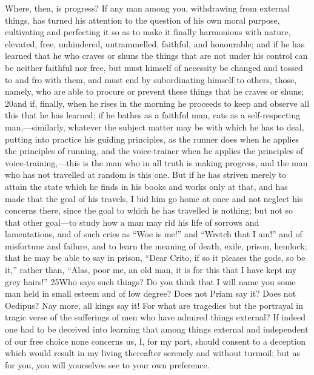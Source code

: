 Where, then, is progress? If any man among you, withdrawing from external things, has turned his attention to the question of his own moral purpose, cultivating and perfecting it so as to make it finally harmonious with nature, elevated, free, unhindered, untrammelled, faithful, and honourable; and if he has learned that he who craves or shuns the things that are not under his control can be neither faithful nor free, but must himself of necessity be changed and tossed to and fro with them, and must end by subordinating himself to others, those, namely, who are able to procure or prevent these things that he craves or shuns; 20and if, finally, when he rises in the morning he proceeds to keep and observe all this that he has learned; if he bathes as a faithful man, eats as a self-respecting man,—similarly, whatever the subject matter may be with which he has to deal, putting into practice his guiding principles, as the runner does when he applies the principles of running, and the voice-trainer when he applies the principles of voice-training,—this is the man who in all truth is making progress, and the man who has not travelled at random is this one. But if he has striven merely to attain the state which he finds in his books and works only at that, and has made that the goal of his travels, I bid him go home at once and not neglect his concerns there, since the goal to which he has travelled is nothing; but not so that other goal—to study how a man may rid his life of sorrows and lamentations, and of such cries as ``Woe is me!'' and ``Wretch that I am!'' and of misfortune and failure, and to learn the meaning of death, exile, prison, hemlock; that he may be able to say in prison, ``Dear Crito, if so it pleases the gods, so be it,'' rather than, ``Alas, poor me, an old man, it is for this that I have kept my grey hairs!'' 25Who says such things? Do you think that I will name you some man held in small esteem and of low degree? Does not Priam say it? Does not Oedipus? Nay more, all kings say it! For what are tragedies but the portrayal in tragic verse of the sufferings of men who have admired things external? If indeed one had to be deceived into learning that among things external and independent of our free choice none concerns us, I, for my part, should consent to a deception which would result in my living thereafter serenely and without turmoil; but as for you, you will yourselves see to your own preference.


